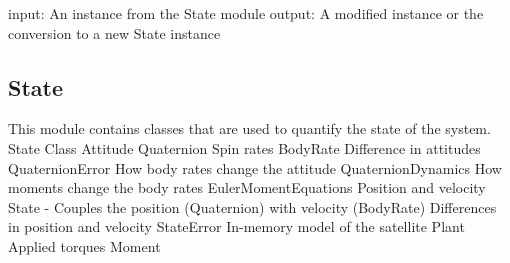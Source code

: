     input: An instance from the State module
    output: A modified instance or the conversion to a new State instance

\subsection{State}
\label{subsec:State}

This module contains classes that are used to quantify the state of the system.
State   Class
Attitude  Quaternion
Spin rates  BodyRate
Difference in attitudes   QuaternionError
How body rates change the attitude  QuaternionDynamics
How moments change the body rates   EulerMomentEquations
Position and velocity   State - Couples the position (Quaternion) with velocity (BodyRate)
Differences in position and velocity  StateError
In-memory model of the satellite  Plant
Applied torques   Moment

